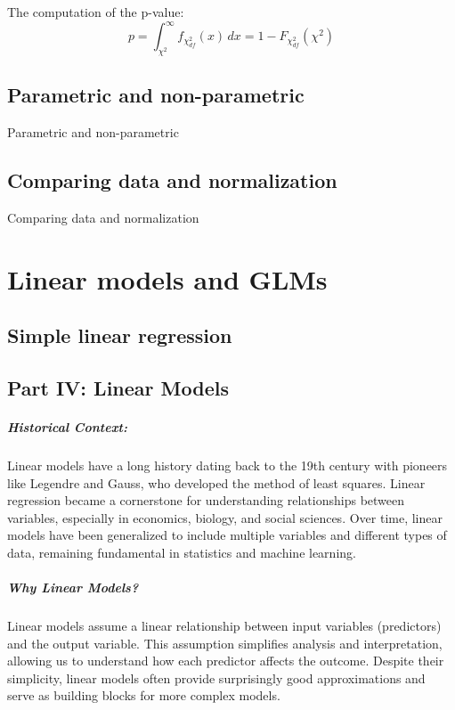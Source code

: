 \documentclass{book}
\begin{document}
The computation of the p-value:
\[
p = \int_{\chi^2}^{\infty} f_{\chi^2_{df}}(x)\,dx = 1 - F_{\chi^2_{df}}(\chi^2)
\]

\newpage

\section{Parametric and non-parametric}

Parametric and non-parametric

\newpage

\section{Comparing data and normalization}
Comparing data and normalization



\chapter{Linear models and GLMs}

\section{Simple linear regression}
\section*{Part IV: Linear Models}

\paragraph{Historical Context:}
Linear models have a long history dating back to the 19th century with pioneers like Legendre and Gauss, who developed the method of least squares. Linear regression became a cornerstone for understanding relationships between variables, especially in economics, biology, and social sciences. Over time, linear models have been generalized to include multiple variables and different types of data, remaining fundamental in statistics and machine learning.

\paragraph{Why Linear Models?}
Linear models assume a linear relationship between input variables (predictors) and the output variable. This assumption simplifies analysis and interpretation, allowing us to understand how each predictor affects the outcome. Despite their simplicity, linear models often provide surprisingly good approximations and serve as building blocks for more complex models.
\end{document}
